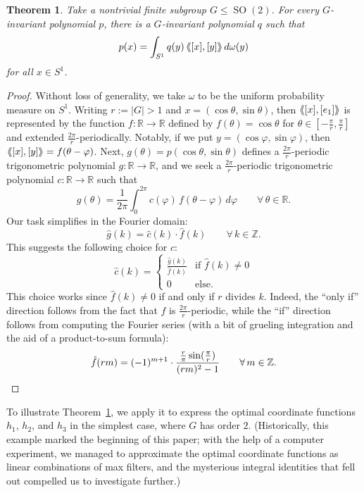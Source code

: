 \documentclass{article}
\theoremstyle{plain}
\newtheorem{theorem}{Theorem}
\theoremstyle{definition}
\newcommand{\llangle}{\langle\hspace{-2.5pt}\langle}
\newcommand{\rrangle}{\rangle\hspace{-2.5pt}\rangle}
\begin{document}
\begin{theorem}
\label{thm.integral combo for rotations of the plane}
Take a nontrivial finite subgroup $G\leq \operatorname{SO}(2)$.
For every $G$-invariant polynomial $p$, there is a $G$-invariant polynomial $q$ such that
\[
p(x)
=\int_{S^1} q(y) \, \llangle [x],[y] \rrangle \, d\omega(y)
\]
for all $x\in S^1$.
\end{theorem}

\begin{proof}
Without loss of generality, we take $\omega$ to be the uniform probability measure on $S^1$.
Writing $r:=|G|>1$ and $x=(\cos\theta,\sin\theta)$, then $\llangle [x],[e_1] \rrangle$ is represented by the function $f\colon\mathbb{R}\to\mathbb{R}$ defined by $f(\theta)=\cos\theta$ for $\theta\in[-\frac{\pi}{r},\frac{\pi}{r}]$ and extended $\frac{2\pi}{r}$-periodically.
Notably, if we put $y=(\cos\varphi,\sin\varphi)$, then $\llangle [x],[y]\rrangle=f(\theta-\varphi)$.
Next, $g(\theta)=p(\cos\theta,\sin\theta)$ defines a $\frac{2\pi}{r}$-periodic trigonometric polynomial $g\colon\mathbb{R}\to\mathbb{R}$, and we seek a $\frac{2\pi}{r}$-periodic trigonometric polynomial $c\colon\mathbb{R}\to\mathbb{R}$ such that
\[
g(\theta)
=\frac{1}{2\pi}\int_0^{2\pi} c(\varphi)\,f(\theta-\varphi)\,d\varphi
\qquad
\forall\,\theta\in\mathbb{R}.
\]
Our task simplifies in the Fourier domain:
\[
\hat{g}(k)
=\hat{c}(k)\cdot\hat{f}(k)
\qquad
\forall\,k\in\mathbb{Z}.
\]
This suggests the following choice for $c$:
\begin{equation}
\label{eq.fourier series of coeff function}
\hat{c}(k)
=\left\{\begin{array}{cl}
\displaystyle\frac{\hat{g}(k)}{\hat{f}(k)}&\text{if }\hat{f}(k)\neq 0\\[12 pt]
0&\text{else.}
\end{array}\right.
\end{equation}
This choice works since $\hat{f}(k)\neq 0$ if and only if $r$ divides $k$.
Indeed, the ``only if'' direction follows from the fact that $f$ is $\frac{2\pi}{r}$-periodic, while the ``if'' direction follows from computing the Fourier series (with a bit of grueling integration and the aid of a product-to-sum formula):
\[
\hat{f}(rm)
=(-1)^{m+1} \cdot \frac{\frac{r}{\pi}\sin(\frac{\pi}{r})}{(rm)^2-1}
\qquad
\forall\,m\in\mathbb{Z}.
\qedhere
\]
\end{proof}

To illustrate Theorem~\ref{thm.integral combo for rotations of the plane}, we apply it to express the optimal coordinate functions $h_1$, $h_2$, and $h_3$ in the simplest case, where $G$ has order $2$.
(Historically, this example marked the beginning of this paper; with the help of a computer experiment, we managed to approximate the optimal coordinate functions as linear combinations of max filters, and the mysterious integral identities that fell out compelled us to investigate further.)
\end{document}
